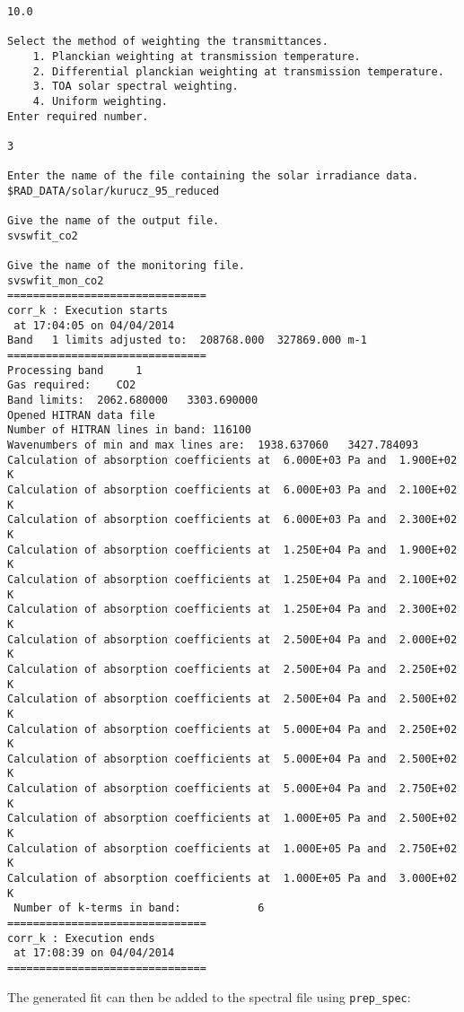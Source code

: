 {\begin{verbatim}
10.0

Select the method of weighting the transmittances.
    1. Planckian weighting at transmission temperature.
    2. Differential planckian weighting at transmission temperature.
    3. TOA solar spectral weighting.
    4. Uniform weighting.
Enter required number.

3

Enter the name of the file containing the solar irradiance data.
$RAD_DATA/solar/kurucz_95_reduced

Give the name of the output file.
svswfit_co2

Give the name of the monitoring file.
svswfit_mon_co2
===============================
corr_k : Execution starts 
 at 17:04:05 on 04/04/2014
Band   1 limits adjusted to:  208768.000  327869.000 m-1
===============================
Processing band     1
Gas required:    CO2
Band limits:  2062.680000   3303.690000
Opened HITRAN data file 
Number of HITRAN lines in band: 116100
Wavenumbers of min and max lines are:  1938.637060   3427.784093
Calculation of absorption coefficients at  6.000E+03 Pa and  1.900E+02 K
Calculation of absorption coefficients at  6.000E+03 Pa and  2.100E+02 K
Calculation of absorption coefficients at  6.000E+03 Pa and  2.300E+02 K
Calculation of absorption coefficients at  1.250E+04 Pa and  1.900E+02 K
Calculation of absorption coefficients at  1.250E+04 Pa and  2.100E+02 K
Calculation of absorption coefficients at  1.250E+04 Pa and  2.300E+02 K
Calculation of absorption coefficients at  2.500E+04 Pa and  2.000E+02 K
Calculation of absorption coefficients at  2.500E+04 Pa and  2.250E+02 K
Calculation of absorption coefficients at  2.500E+04 Pa and  2.500E+02 K
Calculation of absorption coefficients at  5.000E+04 Pa and  2.250E+02 K
Calculation of absorption coefficients at  5.000E+04 Pa and  2.500E+02 K
Calculation of absorption coefficients at  5.000E+04 Pa and  2.750E+02 K
Calculation of absorption coefficients at  1.000E+05 Pa and  2.500E+02 K
Calculation of absorption coefficients at  1.000E+05 Pa and  2.750E+02 K
Calculation of absorption coefficients at  1.000E+05 Pa and  3.000E+02 K
 Number of k-terms in band:            6
===============================
corr_k : Execution ends   
 at 17:08:39 on 04/04/2014
===============================
\end{verbatim}
}

The generated fit can then be added to the spectral file using
{\tt prep\_spec}:

